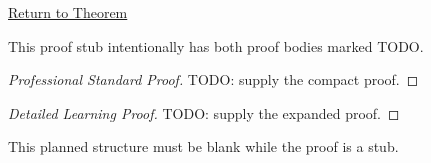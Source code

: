 \newpage
{}
\label{prf:stub-structure}

\begin{remark*}[Return]
\hyperref[thm:stub-structure]{Return to Theorem}
\end{remark*}

\begin{theorem*}
This proof stub intentionally has both proof bodies marked TODO.
\end{theorem*}

\begin{proof}[Professional Standard Proof]
TODO: supply the compact proof.
\end{proof}

\begin{proof}[Detailed Learning Proof]
TODO: supply the expanded proof.
\end{proof}

\begin{remark*}
This planned structure must be blank while the proof is a stub.
\end{remark*}

\NoLocalDependencies
\clearpage
